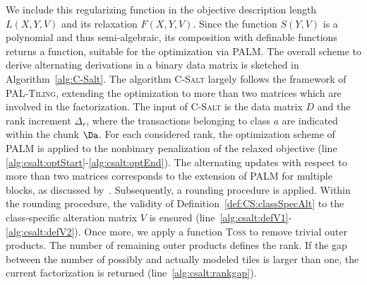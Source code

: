 We include this regularizing function in the objective description length $L(X,Y,V)$ and its relaxation $F(X,Y,V)$. Since the function $S(Y,V)$ is a polynomial and thus semi-algebraic, its composition with definable functions returns a \KL function, suitable for the optimization via PALM. The overall scheme to derive alternating derivations in a binary data matrix is sketched in Algorithm~\ref{alg:C-Salt}. The algorithm \textsc{C-Salt} largely follows the framework of \textsc{PAL-Tiling}, extending the optimization to more than two matrices which are involved in the factorization. The input of \textsc{C-Salt} is the data matrix $D$ and the rank increment $\Delta_r$, where the transactions belonging to class $a$ are indicated within the chunk $\Da$. For each considered rank, the optimization scheme of PALM is applied to the nonbinary penalization of the relaxed objective (line \ref{alg:csalt:optStart}-\ref{alg:csalt:optEnd}). The alternating updates with respect to more than two matrices corresponds to the extension of PALM for multiple blocks, as discussed by~\cite{bolte2014proximal}.  Subsequently, a rounding procedure is applied. Within the rounding procedure, the validity of Definition~\ref{def:CS:classSpecAlt} to the class-specific alteration matrix $V$ is ensured (line~\ref{alg:csalt:defV1}-\ref{alg:csalt:defV2}). Once more, we apply a function \textsc{Toss} to remove trivial outer products. The number of remaining outer products defines the rank. If the gap between the number of possibly and actually modeled tiles is larger than one, the current factorization is returned (line~\ref{alg:csalt:rankgap}).
